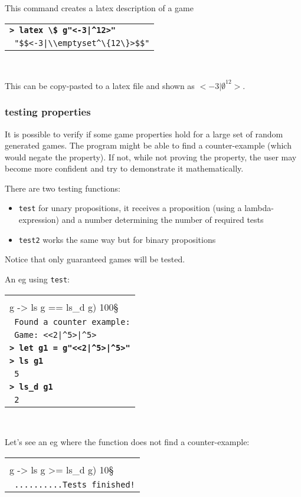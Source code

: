\documentclass[a4paper,12pt]{article}
\newcommand{\bash}[1]{\small\textbf{\lstinline§> #1§}\\}
\newcommand{\out}[1]{\small\lstinline§ #1§}
\newcommand{\haskellCode}{\fontfamily{pcr}\selectfont}
\newenvironment{sgcode}
	{ \haskellCode
	  \begin{tabular}{|p{0.9\textwidth}|}
      \hline	
	}
	{ \\\hline  
      \end{tabular} \\
	  \par 
	}
\begin{document}
This command creates a latex description of a game

\begin{sgcode}
\bash{latex \$ g"<-3|^12>"}
\out{"$$<-3|\\emptyset^\{12\}>$$"}
\end{sgcode}

This can be copy-pasted to a latex file and shown as $<-3|\emptyset^{12}>$.

\subsubsection{testing properties}

It is possible to verify if some game properties hold for a large set of
random generated games. The program might be able to find a counter-example
(which would negate the property). If not, while not proving the property,
the user may become more confident and try to demonstrate it mathematically.

There are two testing functions:

\begin{itemize} \setlength\itemsep{0.1em}
  \item \verb|test| for unary propositions, it receives a proposition (using a lambda-expression) 
  and a number determining the number of required tests
  \item \verb|test2| works the same way but for binary propositions
\end{itemize}

Notice that only guaranteed games will be tested.

An eg using \verb!test!:

\begin{sgcode}
\bash{test (\\g -> ls g == ls_d g) 100}
\out{Found a counter example:} \\
\out{Game: <<2|^5>|^5>} \\
\bash{let g1 = g"<<2|^5>|^5>"}
\bash{ls g1}
\out{5} \\
\bash{ls_d g1}
\out{2}
\end{sgcode}

Let's see an eg where the function does not find a counter-example:

\begin{sgcode}
\bash{test (\\g -> ls g >= ls_d g) 10}
\out{..........Tests finished!}
\end{sgcode}
\end{document}
